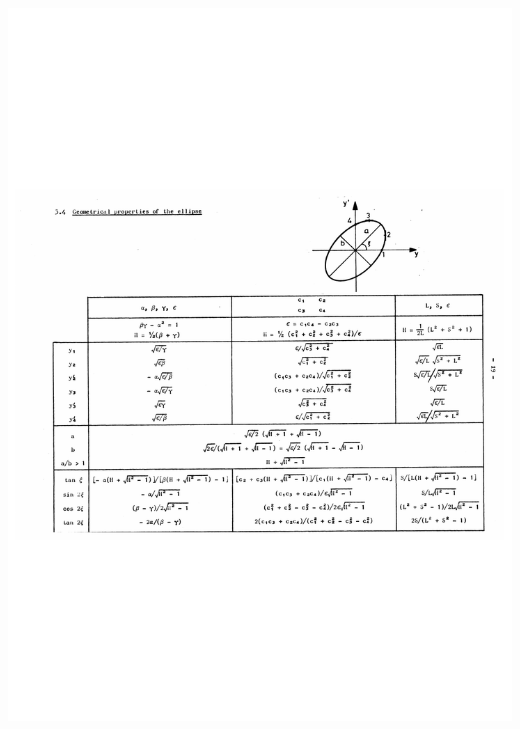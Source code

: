 \documentclass{article}
\begin{document}
\ \\\ \\
\includegraphics[width=15cm, trim={0.cm 7.6cm 0.cm 8.cm}, clip]{ellipse.pdf}
\end{document}
